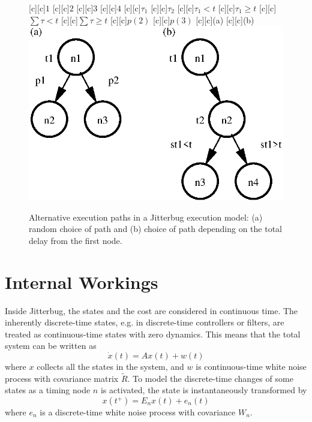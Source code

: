 \documentclass[final,twoside]{rapport}  %
\begin{document}
\begin{figure}[tbp]
  \centerline{
    [c][c]{$1$}
    [c][c]{$2$}
    [c][c]{$3$}
    [c][c]{$4$}
    [c][c]{$\tau_1$}
    [c][c]{$\tau_2$}
    [c][c]{$\tau_1\!<\!t$}
    [c][c]{$\tau_1\!\geq \!t$}
    [c][c]{$\sum \! \tau\!<\!t$}
    [c][c]{$\sum \! \tau\!\geq \!t$}
    [c][c]{$p(2)$}
    [c][c]{$p(3)$}
    [c][c]{\small (a)}
    [c][c]{\small (b)}
    \includegraphics[scale=0.63]{altexec2.eps}
    }
  \caption{Alternative execution paths in a {\sc Jitterbug} execution
    model: (a) random choice of path and (b) choice of path depending
    on the total delay from the first node.} 
  \label{fig:altexec}
\end{figure}

\section{Internal Workings}

Inside {\sc Jitterbug}, the states and the cost are considered
in continuous time. The inherently discrete-time states, e.g. in
discrete-time controllers or filters, are treated as continuous-time
states with zero dynamics. This means that the total system can be
written as 
\begin{equation}
\label{eq:contdyn}
\dot x(t) = Ax(t) + w(t)
\end{equation}
where $x$ collects all the states in the system, and $w$ is
continuous-time white noise process with covariance matrix
$\widetilde{R}$.  To model the discrete-time changes of some states as a
timing node $n$ is activated, the state is instantaneously
transformed by
\begin{equation*}
\label{eq:discdyn}
x(t^+) = E_n x(t) + e_n(t)
\end{equation*}
where $e_{n}$ is a discrete-time white noise process with covariance $W_n$.
\end{document}
